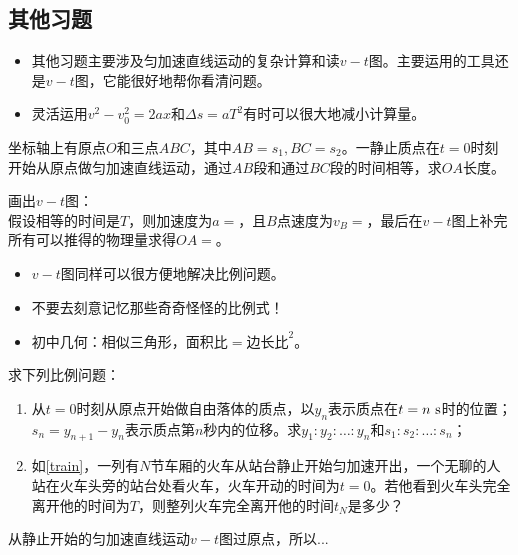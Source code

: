 \documentclass[a4paper,9pt]{ctexart}
\begin{document}
\subsection{其他习题}
\begin{itemize}
\item
其他习题主要涉及匀加速直线运动的复杂计算和读$v-t$图。主要运用的工具还是$v-t$图，它能很好地帮你看清问题。
\item
灵活运用$v^2 - v^2_0 = 2ax$和$\Delta s = aT^2$有时可以很大地减小计算量。
\end{itemize}
\begin{eg}
坐标轴上有原点$O$和三点$ABC$，其中$AB = s_1, BC = s_2$。一静止质点在$t=0$时刻开始从原点做匀加速直线运动，通过$AB$段和通过$BC$段的时间相等，求$OA$长度。
\end{eg}
\begin{ans}
画出$v-t$图：
\vspace{4cm}
\\
假设相等的时间是$T$，则加速度为$a = $\hspace{1cm}，且$B$点速度为$v_B = $\hspace{1cm}，最后在$v-t$图上补完所有可以推得的物理量求得$OA=$\hspace{3cm}。
\end{ans}
\begin{itemize}
\item
$v-t$图同样可以很方便地解决比例问题。
\item
不要去刻意记忆那些奇奇怪怪的比例式！
\item
初中几何：相似三角形，$\text{面积比} = \text{边长比}^2$。
\end{itemize}
\begin{eg}
求下列比例问题：
\begin{enumerate}
\item
从$t=0$时刻从原点开始做自由落体的质点，以$y_n$表示质点在$t=n{\rm \ s}$时的位置；$s_n = y_{n+1} - y_n$表示质点第$n$秒内的位移。求$y_1 :y_2 :\dots :y_n$和$s_1:s_2:\dots :s_n$；
\item
如\cref{train}，一列有$N$节车厢的火车从站台静止开始匀加速开出，一个无聊的人站在火车头旁的站台处看火车，火车开动的时间为$t=0$。若他看到火车头完全离开他的时间为$T$，则整列火车完全离开他的时间$t_N$是多少？
\end{enumerate}
\end{eg}
\begin{ans}
从静止开始的匀加速直线运动$v-t$图过原点，所以...
\vspace{5cm}
\end{ans}
\end{document}
